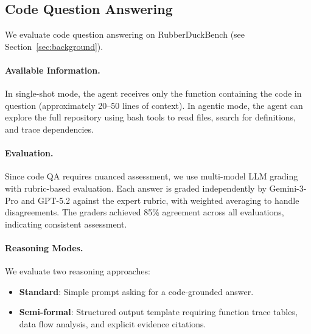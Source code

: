 \documentclass[]{meta}
\begin{document}


\subsection{Code Question Answering}

We evaluate code question answering on RubberDuckBench (see Section~\ref{sec:background}).

\paragraph{Available Information.} In single-shot mode, the agent receives only the function containing the code in question (approximately 20--50 lines of context). In agentic mode, the agent can explore the full repository using bash tools to read files, search for definitions, and trace dependencies.

\paragraph{Evaluation.} Since code QA requires nuanced assessment, we use multi-model LLM grading with rubric-based evaluation. Each answer is graded independently by Gemini-3-Pro and GPT-5.2 against the expert rubric, with weighted averaging to handle disagreements. The graders achieved 85\% agreement across all evaluations, indicating consistent assessment.

\paragraph{Reasoning Modes.} We evaluate two reasoning approaches:
\begin{itemize}[noitemsep]
    \item \textbf{Standard}: Simple prompt asking for a code-grounded answer.
    \item \textbf{Semi-formal}:  Structured output template requiring function trace tables, data flow analysis, and explicit evidence citations.
\end{itemize}
\end{document}
